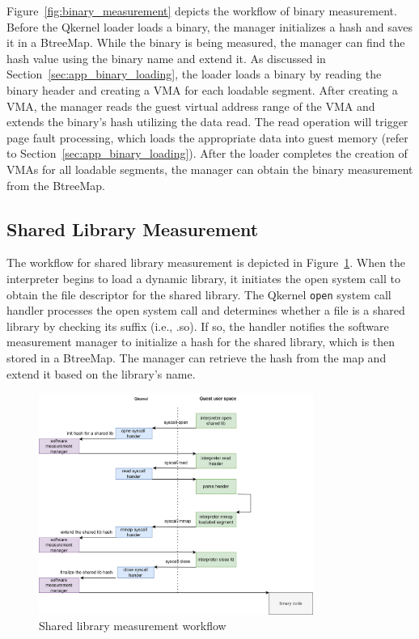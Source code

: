 Figure~\ref{fig:binary_measurement} depicts the workflow of binary measurement. Before the Qkernel loader loads a binary, the manager initializes a hash and saves it in a BtreeMap. While the binary is being measured, the manager can find the hash value using the binary name and extend it. 
As discussed in Section~\ref{sec:app_binary_loading}, the loader loads a binary by reading the binary header and creating a \acrshort{VMA} for each loadable segment. After creating a \acrshort{VMA}, the manager reads the guest virtual address range of the \acrshort{VMA} and extends the binary's hash 
utilizing the data read. The read operation will trigger page fault processing, which loads the appropriate data into guest memory (refer to Section~\ref{sec:app_binary_loading}). After the loader completes the creation of \acrshort{VMA}s for all loadable segments, the manager can obtain the 
binary measurement from the BtreeMap.




\subsection{Shared Library Measurement}

The workflow for shared library measurement is depicted in Figure~\ref{fig:measure_load_shared_libarart}. When the interpreter begins to load a dynamic library, it initiates the open system call to obtain the file descriptor for the shared library. The Qkernel \texttt{open} system call 
handler processes the open system call and determines whether a file is a shared library by checking its suffix (i.e., .so). If so, the handler notifies the software measurement manager to initialize a hash for the shared library, which is then stored in a BtreeMap. The manager can 
retrieve the hash from the map and extend it based on the library's name.


\begin{figure}[!htb]
    \centering
    \includegraphics[width=0.8\textwidth]{images/measure_load_shared_libarart.png}
    \caption[Shared library measurement workflow]{Shared library measurement workflow}
    \label{fig:measure_load_shared_libarart}
\end{figure}

